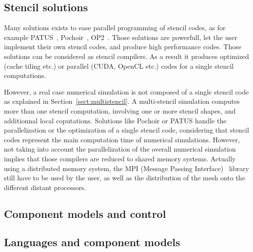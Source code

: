 \subsection{Stencil solutions}

Many solutions exists to ease parallel programming of stencil codes, as for example PATUS~\cite{citeulike12258902}, Pochoir~\cite{spaaTangCKLL11}, OP2~\cite{Giles2011}. Those solutions are powerfull, let the user implement their own stencil codes, and produce high performance codes. Those solutions can be considered as stencil compilers. As a result it produces optimized (cache tiling etc.) or parallel (CUDA, OpenCL etc.) codes for a single stencil computations. 

However, a real case numerical simulation is not composed of a single stencil code as explained in Section~\ref{sect:multistencil}. A multi-stencil simulation computes more than one stencil computation, involving one or more stencil shapes, and additionnal local coputations. Solutions like Pochoir or PATUS handle the parallelization or the optimization of a single stencil code, considering that stencil codes represent the main computation time of numerical simulations. However, not taking into account the parallelization of the overall numerical simulation implies that those compilers are reduced to shared memory systems. Actually using a distributed memory system, the MPI (Message Passing Interface)~\cite{Graham2009MSE} library still have to be used by the user, as well as the distribution of the mesh onto the different distant processors.

\subsection{Component models and control}

\subsection{Languages and component models}
